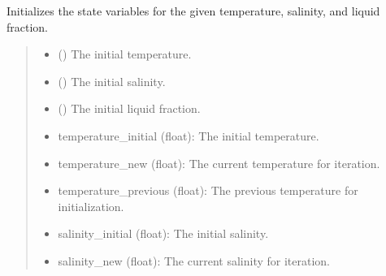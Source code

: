 \documentclass[a4paper,11pt,english,openany]{sphinxmanual}
\begin{document}
\begin{fulllineitems}
\label{\detokenize{api/spyice.statevariables:src.spyice.statevariables.set_initial_statevariables}}
\pysigstartsignatures
\pysiglinewithargsret
{}
{\sphinxparamcomma {}\sphinxparamcomma {}}
{}
\pysigstopsignatures
\sphinxAtStartPar
Initializes the state variables for the given temperature, salinity, and liquid fraction.
\begin{quote}\begin{description}
\begin{itemize}
\item {} 
\sphinxAtStartPar
{} () \textendash{} The initial temperature.

\item {} 
\sphinxAtStartPar
{} () \textendash{} The initial salinity.

\item {} 
\sphinxAtStartPar
{} () \textendash{} The initial liquid fraction.

\end{itemize}

\sphinxAtStartPar
\begin{description}
\begin{itemize}
\item {} 
\sphinxAtStartPar
temperature\_initial (float): The initial temperature.

\item {} 
\sphinxAtStartPar
temperature\_new (float): The current temperature for iteration.

\item {} 
\sphinxAtStartPar
temperature\_previous (float): The previous temperature for initialization.

\item {} 
\sphinxAtStartPar
salinity\_initial (float): The initial salinity.

\item {} 
\sphinxAtStartPar
salinity\_new (float): The current salinity for iteration.


\end{itemize}
\end{description}
\end{description}
\end{quote}
\end{fulllineitems}
\end{document}
